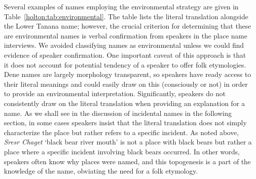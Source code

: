 Several examples of names employing the environmental strategy are given in  Table~\ref{holton:tab:environmental}. The table lists the literal translation alongside the Lower Tanana name; however, the crucial criterion for determining that these are environmental names is verbal confirmation from speakers in the place name interviews. We avoided classifying names as environmental unless we could find evidence of speaker confirmation. One important caveat of this approach is that it does not account for potential tendency of a speaker to offer folk etymologies. Dene names are largely morphology transparent, so speakers have ready access to their literal meanings and could easily draw on this (consciously or not) in order to provide an environmental interpretation. Significantly, speakers do not consistently draw on the literal translation when providing an explanation for a name. As we shall see in the discussion of incidental names in the following section, in some cases speakers insist that the literal translation does not simply characterize the place but rather refers to a specific incident. As noted above, \textit{Sresr Chaget} ‘black bear river mouth’ is not a place with black bears but rather a place where a specific incident involving black bears occurred. In other words, speakers often know why places were named, and this topogenesis is a part of the knowledge of the name, obviating the need for a folk etymology.



